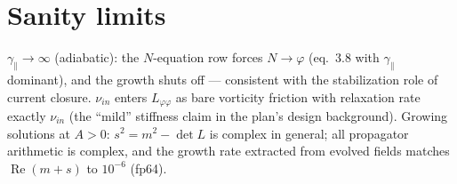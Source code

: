 \documentclass[11pt]{article}
\newcommand{\gpar}{\gamma_\parallel}
\newcommand{\nuin}{\nu_{in}}
\begin{document}
\section{Sanity limits}

$\gpar\to\infty$ (adiabatic): the $N$-equation row forces $N\to\varphi$
(eq.~3.8 with $\gpar$ dominant), and the growth shuts off --- consistent with the
stabilization role of current closure. $\nuin$ enters $L_{\varphi\varphi}$ as bare
vorticity friction with relaxation rate exactly $\nuin$ (the ``mild'' stiffness claim in
the plan's design background). Growing solutions at $A>0$: $s^2 = m^2 - \det L$ is
complex in general; all propagator arithmetic is complex, and the growth rate extracted
from evolved fields matches $\operatorname{Re}(m+s)$ to $10^{-6}$ (fp64).
\end{document}
